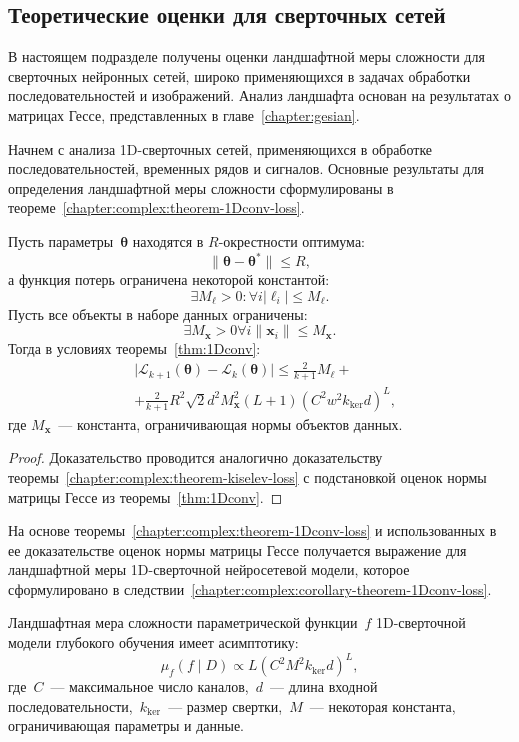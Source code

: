 \subsection{Теоретические оценки для сверточных сетей}

В настоящем подразделе получены оценки ландшафтной меры сложности для сверточных нейронных сетей, широко применяющихся в задачах обработки последовательностей и изображений. Анализ ландшафта основан на результатах о матрицах Гессе, представленных в главе~\ref{chapter:gesian}.

Начнем с анализа 1D-сверточных сетей, применяющихся в обработке последовательностей, временных рядов и сигналов. Основные результаты для определения ландшафтной меры сложности сформулированы в теореме~\ref{chapter:complex:theorem-1Dconv-loss}.

\begin{theorem}\label{chapter:complex:theorem-1Dconv-loss}
Пусть параметры~$\boldsymbol{\theta}$ находятся в $R$-окрестности оптимума:
\[
    \|\boldsymbol{\theta} - \boldsymbol{\theta}^*\| \leqslant R,
\]
а функция потерь ограничена некоторой константой:
\[
    \exists  M_{\ell} > 0:  \forall i |\ell_i| \leqslant M_{\ell}.
\]
Пусть все объекты в наборе данных ограничены:
\[
    \exists M_{\mathbf{x}} > 0 \forall i  \|\mathbf{x}_i\| \leqslant M_{\mathbf{x}}.
\]
Тогда в условиях теоремы~\ref{thm:1Dconv}:
\begin{align}
    & \big|\mathcal{L}_{k+1}(\boldsymbol{\theta}) - \mathcal{L}_{k}(\boldsymbol{\theta})\big| \leqslant \frac{2}{k+1}M_{\ell} +\\
    & + \frac{2}{k+1}R^2\sqrt{2}d^2M_{\mathbf{x}}^2(L+1)(C^2w^2k_{\mathrm{ker}}d)^L,
\end{align}
где $M_{\mathbf{x}}$~--- константа, ограничивающая нормы объектов данных.
\end{theorem}
\begin{proof}
    Доказательство проводится аналогично доказательству теоремы~\ref{chapter:complex:theorem-kiselev-loss} с подстановкой оценок нормы матрицы Гессе из теоремы~\ref{thm:1Dconv}.
\end{proof}

На основе теоремы~\ref{chapter:complex:theorem-1Dconv-loss} и использованных в ее доказательстве оценок нормы матрицы Гессе получается выражение для ландшафтной меры 1D-сверточной нейросетевой модели, которое сформулировано в следствии~\ref{chapter:complex:corollary-theorem-1Dconv-loss}.

\begin{corollary}\label{chapter:complex:corollary-theorem-1Dconv-loss}
    Ландшафтная мера сложности параметрической функции~$f$ 1D-сверточной модели глубокого обучения имеет асимптотику:
    \[
        \mu_f(f\mid D) \propto L(C^2M^2k_{\mathrm{ker}}d)^{L},
    \]
    где~$C$~--- максимальное число каналов,~$d$~--- длина входной последовательности,~$k_{\mathrm{ker}}$~--- размер свертки,~$M$~--- некоторая константа, ограничивающая параметры и данные.
\end{corollary}


